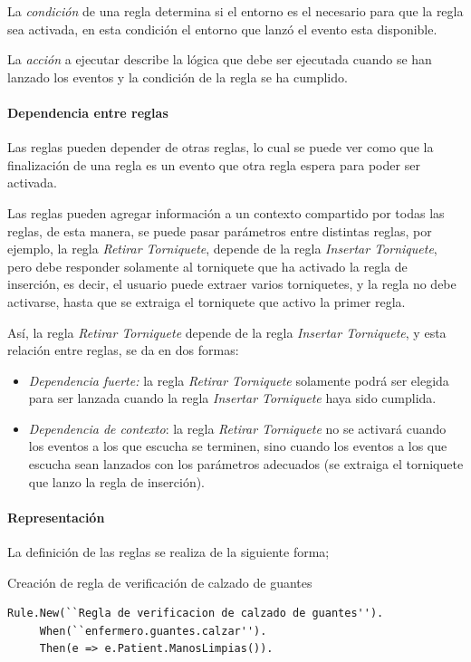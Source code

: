 La \emph{condición} de una regla determina si el entorno es el necesario para que la
regla sea activada, en esta condición el entorno que lanzó el evento esta
disponible.

La \emph{acción} a ejecutar describe la lógica que debe ser ejecutada cuando se han
lanzado los eventos y la condición de la regla se ha cumplido.

\paragraph{Dependencia entre reglas}

Las reglas pueden depender de otras reglas, lo cual se puede ver como que la
finalización de una regla es un evento que otra regla espera para poder ser
activada.

Las reglas pueden agregar información a un contexto compartido por todas las
reglas, de esta manera, se puede pasar parámetros entre distintas reglas, por
ejemplo, la regla \emph{Retirar Torniquete}, depende de la regla \emph{Insertar
Torniquete}, pero debe responder solamente al torniquete que ha activado
la regla de inserción, es decir, el usuario puede extraer varios torniquetes, y
la regla no debe activarse, hasta que se extraiga el torniquete que activo la
primer regla.

Así, la regla \emph{Retirar Torniquete} depende de la regla \emph{Insertar
Torniquete}, y esta relación entre reglas, se da en dos
formas\cite{bailey2004event}:

\begin{itemize}
\item  \emph{Dependencia fuerte:} la regla \emph{Retirar Torniquete} solamente podrá
	ser elegida para ser lanzada cuando la regla \emph{Insertar Torniquete}
	haya sido cumplida.
\item  \emph{Dependencia de contexto}: la regla \emph{Retirar Torniquete} no se
	activará cuando los eventos a los que escucha se terminen, sino cuando
	los eventos a los que escucha sean lanzados con los parámetros adecuados
	(se extraiga el torniquete que lanzo la regla de inserción).
\end{itemize}

\paragraph{Representación}

La definición de las reglas se realiza de la siguiente forma;
\begin{algorithm}[H]
\caption{Creación de regla de verificación de calzado de guantes}
\label{alg:rule:guante}
\lstset{style=sharpc}
\begin{lstlisting}
Rule.New(``Regla de verificacion de calzado de guantes'').
     When(``enfermero.guantes.calzar'').
     Then(e => e.Patient.ManosLimpias()).
\end{lstlisting}
\end{algorithm}

